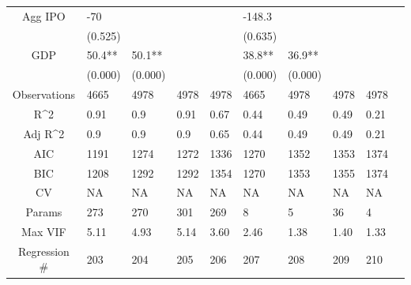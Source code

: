 \documentclass{article}
\begin{document}
\begin{table}[H]
\begin{tabular}{|clllllllll|}
  Agg IPO & -70 &  &  &  & -148.3 &  &  &  & \\ 
   & (0.525) &  &  &  & (0.635) &  &  &  & \\ 
  GDP & 50.4** & 50.1** &  &  & 38.8** & 36.9** &  &  & \\ 
   & (0.000) & (0.000) &  &  & (0.000) & (0.000) &  &  & \\ 
  \hline 
 Observations & 4665 & 4978 & 4978 & 4978 & 4665 & 4978 & 4978 & 4978 & \\ 
  R^2 & 0.91 & 0.9 & 0.91 & 0.67 & 0.44 & 0.49 & 0.49 & 0.21 & \\ 
  Adj R^2 & 0.9 & 0.9 & 0.9 & 0.65 & 0.44 & 0.49 & 0.49 & 0.21 & \\ 
  AIC & 1191 & 1274 & 1272 & 1336 & 1270 & 1352 & 1353 & 1374 & \\ 
  BIC & 1208 & 1292 & 1292 & 1354 & 1270 & 1353 & 1355 & 1374 & \\ 
  CV & NA & NA & NA & NA & NA & NA & NA & NA & \\ 
  Params & 273 & 270 & 301 & 269 & 8 & 5 & 36 & 4 & \\ 
  Max VIF & 5.11 & 4.93 & 5.14 & 3.60 & 2.46 & 1.38 & 1.40 & 1.33 & \\ 
  Regression \# & 203 & 204 & 205 & 206 & 207 & 208 & 209 & 210 & \\ 
   \hline
\end{tabular}
 
\end{table}
\end{document}
